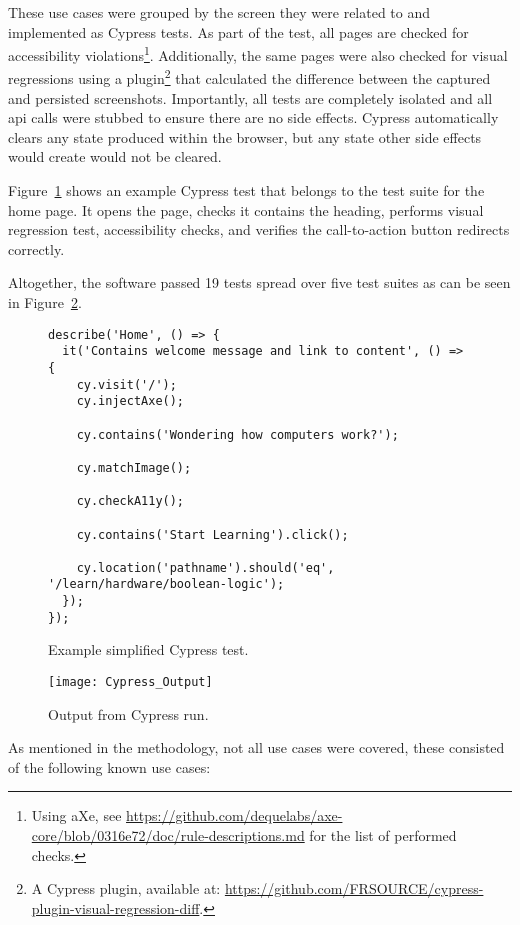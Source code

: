 These use cases were grouped by the screen they were related to and implemented as Cypress tests.
As part of the test, all pages are checked for accessibility violations\footnote{Using aXe, see \url{https://github.com/dequelabs/axe-core/blob/0316e72/doc/rule-descriptions.md} for the list of performed checks.}.
Additionally, the same pages were also checked for visual regressions using a plugin\footnote{A Cypress plugin, available at: \url{https://github.com/FRSOURCE/cypress-plugin-visual-regression-diff}.} that calculated the difference between the captured and persisted screenshots.
Importantly, all tests are completely isolated and all \gls{api} calls were stubbed to ensure there are no side effects.
Cypress automatically clears any state produced within the browser, but any state other side effects would create would not be cleared.

Figure~\ref{fig:test-cypress-example} shows an example Cypress test that belongs to the test suite for the home page.
It opens the page, checks it contains the heading, performs visual regression test, accessibility checks, and verifies the call-to-action button redirects correctly.

Altogether, the software passed 19 tests spread over five test suites as can be seen in Figure~\ref{fig:test-cypress}.

\begin{figure}[H]
\begin{verbatim}
describe('Home', () => {
  it('Contains welcome message and link to content', () => {
    cy.visit('/');
    cy.injectAxe();

    cy.contains('Wondering how computers work?');

    cy.matchImage();

    cy.checkA11y();

    cy.contains('Start Learning').click();

    cy.location('pathname').should('eq', '/learn/hardware/boolean-logic');
  });
});
\end{verbatim}
    \caption{Example simplified Cypress test.}
    \label{fig:test-cypress-example}
\end{figure}

\begin{figure}[H]
    \texttt{[image: Cypress\_Output]}
    \caption{Output from Cypress run.}
    \label{fig:test-cypress}
\end{figure}

As mentioned in the methodology, not all use cases were covered, these consisted of the following known use cases:

